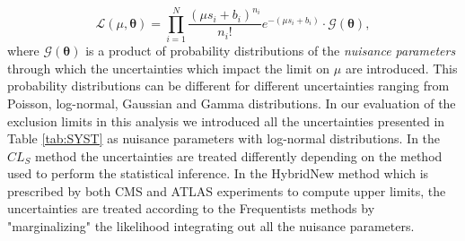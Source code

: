 \begin{equation}\label{eq:LL}
\mathcal{L}\left( \mu, \mathbf{\theta} \right) = \prod^{N}_{i=1} \frac{{\left( \mu s_{i} + b_{i} \right)}^{n_{i}}}{n_{i}!} e^{-(\mu s_{i} + b_{i})} \cdot \mathcal{G}(\mathbf{\theta} ),
\end{equation}
where $\mathcal{G}(\mathbf{\theta})$ is a product of probability distributions of the \textit{nuisance parameters} through which the uncertainties which impact the limit on $\mu$ are introduced. This probability distributions can be different for different uncertainties ranging from Poisson, log-normal, Gaussian and Gamma distributions. In our evaluation of the exclusion limits in this analysis we introduced all the uncertainties presented in Table \ref{tab:SYST} as nuisance parameters with log-normal distributions.
In the $CL_{S}$ method the uncertainties are treated differently depending on the method used to perform the statistical inference. In the HybridNew method which is prescribed by both CMS and ATLAS experiments to compute upper limits, the uncertainties are treated according to the Frequentists methods by "marginalizing" the likelihood \ie integrating out all the nuisance parameters. 
